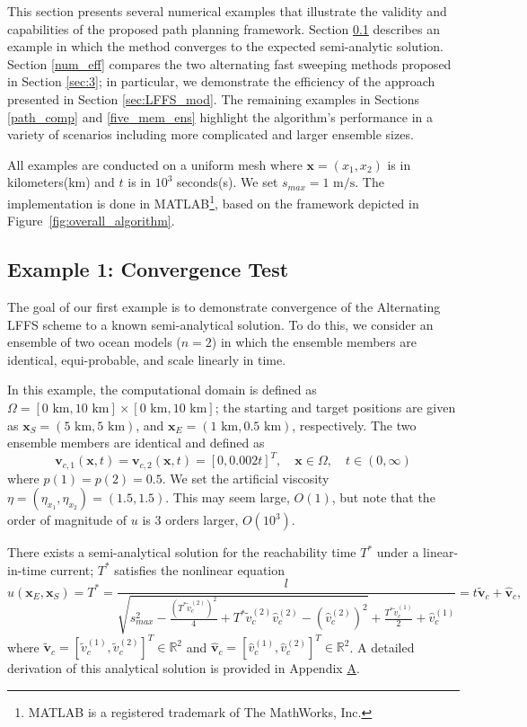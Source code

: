 \documentclass[pdflatex,sn-mathphys-num]{sn-jnl}%
\def \bx{{\mathbf {x}}}
\def \bv{{\mathbf {v}}}
\theoremstyle{thmstyleone}%
\theoremstyle{thmstyletwo}%
\theoremstyle{thmstylethree}%
\begin{document}
This section presents several numerical examples that illustrate the validity and capabilities of the proposed path planning framework. Section \ref{sec:num_conv} describes an example in which the method converges to the expected semi-analytic solution.  Section \ref{num_eff} compares the two alternating fast sweeping methods proposed in Section \ref{sec:3}; in particular, we demonstrate the efficiency of the approach presented in Section \ref{sec:LFFS_mod}. The remaining examples in Sections \ref{path_comp} and \ref{five_mem_ens}  highlight the algorithm's performance in a variety of scenarios including more complicated and larger ensemble sizes.  

All examples are conducted on a uniform mesh where $\bx=(x_1,x_2)$ is in kilometers(km) and $t$ is in $10^3$ seconds(s). We set $s_{max}=1\text{ m/s}$.  The implementation is done in MATLAB\textsuperscript{\textregistered}\footnote{MATLAB is a registered trademark of The MathWorks, Inc.}, based on the framework depicted in Figure~\ref{fig:overall_algorithm}.


\subsection{Example 1: Convergence Test}
\label{sec:num_conv}





The goal of our first example is to demonstrate convergence of the Alternating LFFS scheme to a known semi-analytical solution.  To do this, we consider an ensemble of two ocean models ($n=2$) in which the ensemble members are identical, equi-probable, and scale linearly in time.  



In this example, the computational domain is defined as $\Omega = [0\text{ km},10\text{ km}] \times [0\text{ km},10\text{ km}]$; the starting and target positions are given as $\bx_S = (5\text{ km},5\text{ km})$, and $\bx_E = (1\text{ km},0.5\text{ km})$, respectively.  The two ensemble members are identical and defined as
$$
\bv_{c,1}(\bx,t)=\bv_{c,2}(\bx,t)=[0, 0.002t]^T, \quad \bx\in \Omega, \quad t \in (0,\infty)
$$
where $p(1)=p(2)=0.5$.  We set the artificial viscosity $\eta=(\eta_{x_1},\eta_{x_2})=(1.5,1.5)$.  This may seem large, $O(1)$, but note that the order of magnitude of $u$ is 3 orders larger, $O(10^3)$.




There exists a semi-analytical solution for the reachability time $T^*$ under a linear-in-time current; $T^*$ satisfies the nonlinear equation
\begin{equation*}
    u(\bx_E,\bx_S) = T^* = \frac{l}{\sqrt{s_{max}^2 - \frac{\left(T^* \tilde{v}_c^{(2)}\right)^2}{4} + T^* \tilde{v}_c^{(2)} \hat{v}_c^{(2)} - \left(\hat{v}_c^{(2)}\right)^2 } + \frac{T^* \tilde{v}_c^{(1)}}{2} + \hat{v}_c^{(1)}} = t \tilde{\bv}_c + \hat{\bv}_c,
    \label{eq:analytic_sol}
\end{equation*}
where $\tilde{\bv}_c=[\tilde{v}_c^{(1)},\tilde{v}_c^{(2)}]^T \in \mathbb{R}^2$ and $\hat{\bv}_c=[\hat{v}_c^{(1)},\hat{v}_c^{(2)}]^T \in \mathbb{R}^2$.  A detailed derivation of this analytical solution is provided in Appendix \href{sec:app}{A}.
\end{document}
